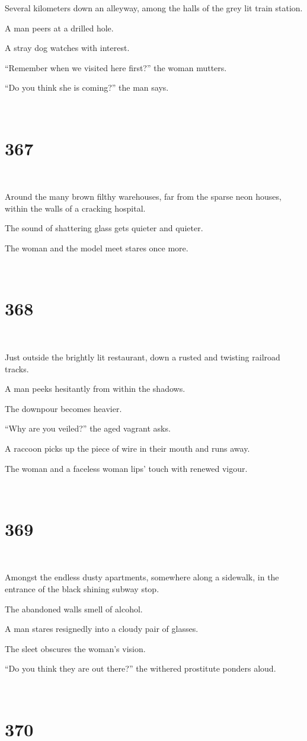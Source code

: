 \documentclass{report}
\begin{document}
Several kilometers down an alleyway, among the halls of the grey lit train station.

A man peers at a drilled hole.

A stray dog watches with interest.

``Remember when we visited here first?'' the woman mutters.

``Do you think she is coming?'' the man says.

~
\chapter*{367}
~

Around the many brown filthy warehouses, far from the sparse neon houses, within the walls of a cracking hospital.

The sound of shattering glass gets quieter and quieter.

The woman and the model meet stares once more.

~
\chapter*{368}
~

Just outside the brightly lit restaurant, down a rusted and twisting railroad tracks.

A man peeks hesitantly from within the shadows.

The downpour becomes heavier.

``Why are you veiled?'' the aged vagrant asks.

A raccoon picks up the piece of wire in their mouth and runs away.

The woman and a faceless woman lips' touch with renewed vigour.

~
\chapter*{369}
~

Amongst the endless dusty apartments, somewhere along a sidewalk, in the entrance of the black shining subway stop.

The abandoned walls smell of alcohol.

A man stares resignedly into a cloudy pair of glasses.

The sleet obscures the woman's vision.

``Do you think they are out there?'' the withered prostitute ponders aloud.

~
\chapter*{370}
~
\end{document}
